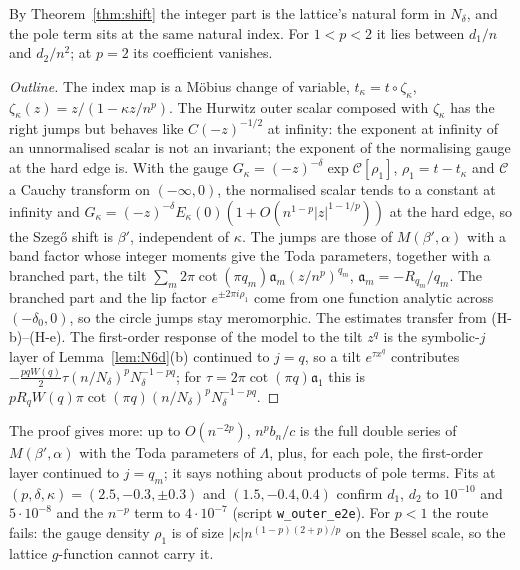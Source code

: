By Theorem~\ref{thm:shift} the integer part is the lattice's natural form in $N_\delta$, and the pole term sits at the same natural index. For
$1<p<2$ it lies between $d_1/n$ and $d_2/n^2$; at $p=2$ its coefficient vanishes.

\begin{proof}[Outline]
The index map is a M\"obius change of variable, $t_\kappa=t\circ\zeta_\kappa$, $\zeta_\kappa(z)=z/(1-\kappa z/n^p)$. The Hurwitz outer scalar composed with
$\zeta_\kappa$ has the right jumps but behaves like $C(-z)^{-1/2}$ at infinity: the exponent at infinity of an unnormalised scalar is not an
invariant; the exponent of the normalising gauge at the hard edge is. With the gauge $G_\kappa=(-z)^{-\delta}\exp\mathcal C[\rho_1]$, $\rho_1=t-t_\kappa$
and $\mathcal C$ a Cauchy transform on $(-\infty,0)$, the normalised scalar tends to a constant at infinity and
$G_\kappa=(-z)^{-\delta}E_\kappa(0)(1+O(n^{1-p}|z|^{1-1/p}))$ at the hard edge, so the Szeg\H{o} shift is $\beta'$, independent of $\kappa$. The jumps
are those of $M(\beta',\alpha)$ with a band factor whose integer moments give the Toda parameters, together with a branched part, the tilt
$\sum_m2\pi\cot(\pi q_m)\mathfrak a_m(z/n^p)^{q_m}$, $\mathfrak a_m=-R_{q_m}/q_m$. The branched part and the lip factor $e^{\pm2\pi i\rho_1}$ come from one function
analytic across $(-\delta_0,0)$, so the circle jumps stay meromorphic. The estimates transfer from (H-b)--(H-e). The first-order response of the model to
the tilt $z^q$ is the symbolic-$j$ layer of Lemma~\ref{lem:N6d}(b) continued to $j=q$, so a tilt $e^{\tau x^q}$ contributes
$-\frac{pqW(q)}2\tau(n/N_\delta)^pN_\delta^{-1-pq}$; for $\tau=2\pi\cot(\pi q)\mathfrak a_1$ this is $pR_qW(q)\pi\cot(\pi q)(n/N_\delta)^pN_\delta^{-1-pq}$.
\end{proof}

The proof gives more: up to $O(n^{-2p})$, $n^pb_n/c$ is the full double series of $M(\beta',\alpha)$ with the Toda parameters of $\Lambda$, plus, for
each pole, the first-order layer continued to $j=q_m$; it says nothing about products of pole terms. Fits at $(p,\delta,\kappa)=(2.5,-0.3,\pm0.3)$
and $(1.5,-0.4,0.4)$ confirm $d_1$, $d_2$ to $10^{-10}$ and $5\cdot10^{-8}$ and the $n^{-p}$ term to $4\cdot10^{-7}$ (script \texttt{w\_outer\_e2e}).
For $p<1$ the route fails: the gauge density $\rho_1$ is of size $|\kappa|n^{(1-p)(2+p)/p}$ on the Bessel scale, so the lattice $g$-function cannot
carry it.

